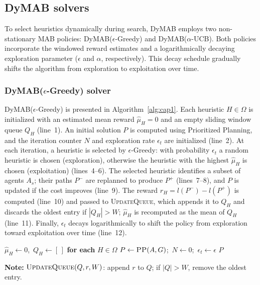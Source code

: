 \documentclass[review]{jair}
\begin{document}
\subsection{DyMAB solvers}
To select heuristics dynamically during search, DyMAB employs two non-stationary MAB policies: DyMAB($\epsilon$-Greedy) and DyMAB($\alpha$-UCB). Both policies incorporate the windowed reward estimates and a logarithmically decaying exploration parameter (\(\epsilon\) and \(\alpha\), respectively). This decay schedule gradually shifts the algorithm from exploration to exploitation over time.

\subsubsection{DyMAB($\epsilon$-Greedy) solver}
DyMAB($\epsilon$-Greedy) is presented in Algorithm~\ref{alg:cap1}. Each heuristic $H \in \Omega$ is initialized with an estimated mean reward $\hat{\mu}_H = 0$ and an empty sliding window queue $Q_H$ (line~1). An initial solution $P$ is computed using Prioritized Planning, and the iteration counter $N$ and exploration rate $\epsilon_t$ are initialized (line~2). At each iteration, a heuristic is selected by $\epsilon$-Greedy: with probability $\epsilon_t$ a random heuristic is chosen (exploration), otherwise the heuristic with the highest $\hat{\mu}_H$ is chosen (exploitation) (lines~4--6). The selected heuristic identifies a subset of agents $A_s$; their paths $P^-$ are replanned to produce $P^+$ (lines~7--8), and $P$ is updated if the cost improves (line~9). The reward $r_H = l(P^-) - l(P^+)$ is computed (line~10) and passed to \textsc{UpdateQueue}, which appends it to $Q_H$ and discards the oldest entry if $|Q_H| > W$; $\hat{\mu}_H$ is recomputed as the mean of $Q_H$ (line~11). Finally, $\epsilon_t$ decays logarithmically to shift the policy from exploration toward exploitation over time (line~12).
\begin{algorithm}[t]
\caption{DyMAB($\epsilon$-Greedy)}
\label{alg:cap1}
$\hat{\mu}_H \gets 0$,\ $Q_H \gets [\,]$ \textbf{for each} $H \in \Omega$\;
$P \gets \textsc{PP}(A, G)$;\ $N \gets 0$;\ $\epsilon_t \gets \epsilon$\;
\Return $P$\;
\end{algorithm}
\noindent\small\textbf{Note:} $\textsc{UpdateQueue}(Q, r, W)$: append $r$ to $Q$; if $|Q| > W$, remove the oldest entry.
\end{document}
